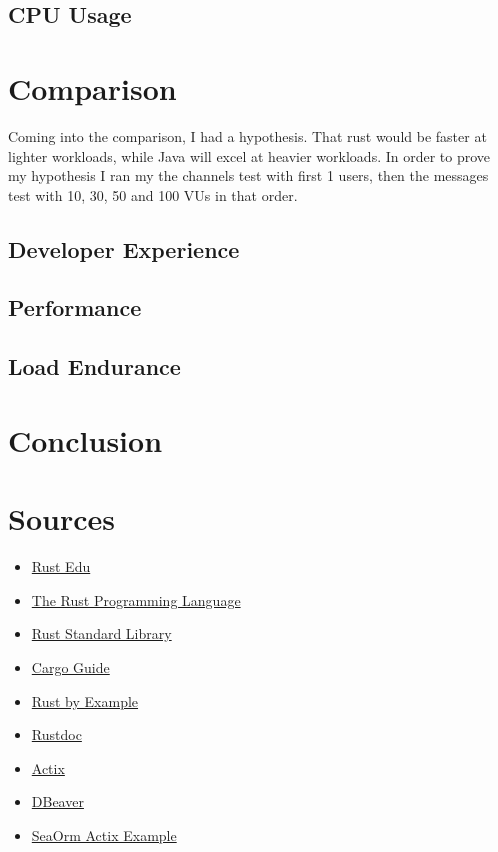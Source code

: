 \documentclass[a4paper,12pt]{article}
\begin{document}
	\subsection*{CPU Usage}

	\section{Comparison}
	\label{sec:comparison}
	Coming into the comparison, I had a hypothesis. That rust would be faster at lighter workloads, while Java will excel at heavier
	workloads. In order to prove my hypothesis I ran my the channels test with first 1 users, then the messages test with 10, 30, 50
	and 100 VUs in that order.

	\subsection{Developer Experience}
	\label{subsec:developer_experience}
	
	\subsection{Performance}
	\label{subsec:performance}

	\subsection{Load Endurance}
	\label{subsec:load_endurance}

	\section{Conclusion}
	\label{subsec:conclusion}
	
	\newpage
	\section{Sources}
	\label{sec:Sources}
	\begin{itemize}
		\item \href{https://rust-edu.org/resources/}{Rust Edu}
		\item \href{https://doc.rust-lang.org/book/}{The Rust Programming Language}
		\item \href{https://doc.rust-lang.org/std/}{Rust Standard Library}
		\item \href{https://doc.rust-lang.org/cargo/}{Cargo Guide}
		\item \href{https://doc.rust-lang.org/rust-by-example/}{Rust by Example}
		\item \href{https://doc.rust-lang.org/rustdoc/}{Rustdoc}
		\item \href{https://actix.rs/}{Actix}
		\item \href{https://dbeaver.io/}{DBeaver}
		\item \href{https://github.com/SeaQL/SeaOrm/tree/master/examples/actix_example}{SeaOrm Actix Example}
	\end{itemize}
	\printbibliography[title={Whole bibliography}]
\end{document}
